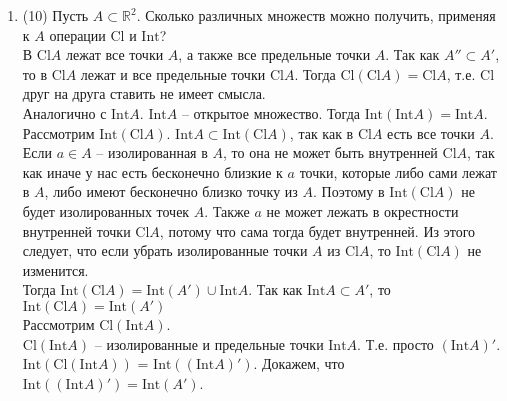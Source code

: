 \documentclass[a4paper]{article}
\def\Int{\mathrm{Int}}
\def\Cl{\mathrm{Cl}}
\begin{document}
\begin{enumerate}
    \item (10) Пусть $A\subset \mathbb R^2$. Сколько различных множеств можно получить, применяя к $A$ операции $\Cl$ и $\Int$?\\
    В $\Cl A$ лежат все точки $A$, а также все предельные точки $A$. Так как $A'' \subset A'$, то в $\Cl A$ лежат и все предельные точки $\Cl A$. Тогда $\Cl(\Cl A) = \Cl A$, т.е. $\Cl$ друг на друга ставить не имеет смысла.\\
    Аналогично с $\Int A$. $\Int A$ -- открытое множество. Тогда $\Int(\Int A) = \Int A$.\\
    Рассмотрим $\Int(\Cl A)$. $\Int A \subset \Int(\Cl A)$, так как в $\Cl A$ есть все точки $A$.\\
    Если $a \in A$ -- изолированная в $A$, то она не может быть внутренней $\Cl A$, так как иначе у нас есть бесконечно близкие к $a$ точки, которые либо сами лежат в $A$, либо имеют бесконечно близко точку из $A$. Поэтому в $\Int(\Cl A)$ не будет изолированных точек $A$. Также $a$ не может лежать в окрестности внутренней точки $\Cl A$, потому что сама тогда будет внутренней. Из этого следует, что если убрать изолированные точки $A$ из $\Cl A$, то $\Int (\Cl A)$ не изменится.\\
    Тогда $\Int(\Cl A) = \Int (A') \cup \Int A$. Так как $\Int A\subset A'$, то $\Int(\Cl A) = \Int (A')$\\
    Рассмотрим $\Cl(\Int A)$.\\
    $\Cl(\Int A)$ -- изолированные и предельные точки $\Int A$. Т.е. просто $(\Int A)'$.\\
    $\Int(\Cl(\Int A))$ = $\Int((\Int A)')$. Докажем, что $\Int((\Int A)') = \Int(A')$.\\



\end{enumerate}
\end{document}
